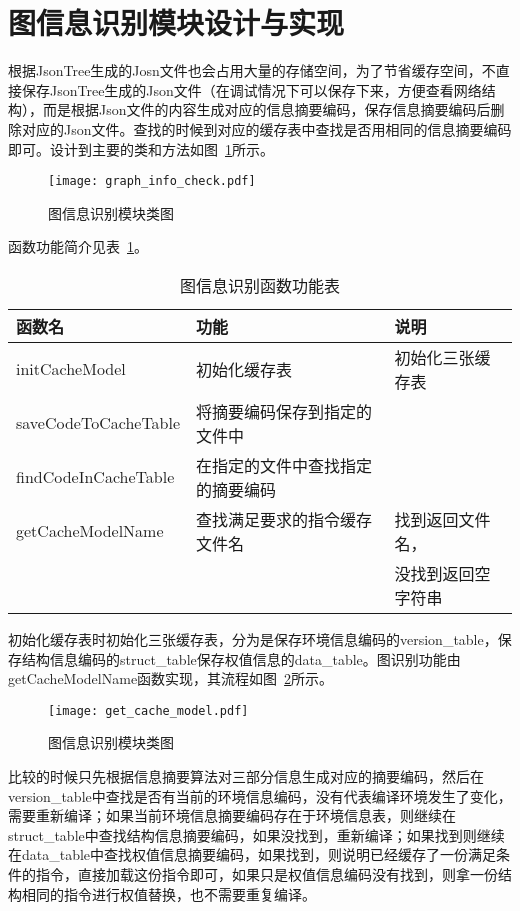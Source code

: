 \section{图信息识别模块设计与实现}
根据JsonTree生成的Josn文件也会占用大量的存储空间，为了节省缓存空间，不直接保存JsonTree生成的Json文件（在调试情况下可以保存下来，方便查看网络结构），而是根据Json文件的内容生成对应的信息摘要编码，保存信息摘要编码后删除对应的Json文件。查找的时候到对应的缓存表中查找是否用相同的信息摘要编码即可。设计到主要的类和方法如图~\ref{fig:graph-info-check}所示。

\begin{figure}[htb]
  \centering
  \texttt{[image: graph\_info\_check.pdf]}
  \caption{图信息识别模块类图}
  \label{fig:graph-info-check}
\end{figure}

函数功能简介见表~\ref{tab:function-desc-tab}。

\begin{table}[htb]
  \centering\small
  \caption{图信息识别函数功能表}
  \label{tab:function-desc-tab}
  \begin{tabular}{lll}
    \toprule
    函数名      & 功能   & 说明                       \\
    \midrule
    initCacheModel       & 初始化缓存表  & 初始化三张缓存表  \\
    saveCodeToCacheTable & 将摘要编码保存到指定的文件中 &     \\
    findCodeInCacheTable & 在指定的文件中查找指定的摘要编码  & \\
    getCacheModelName & 查找满足要求的指令缓存文件名  & 找到返回文件名，\\
                                                  &&没找到返回空字符串 \\
    \bottomrule
  \end{tabular}
\end{table}

初始化缓存表时初始化三张缓存表，分为是保存环境信息编码的version\_table，保存结构信息编码的struct\_table保存权值信息的data\_table。图识别功能由getCacheModelName函数实现，其流程如图~\ref{fig:get-cache-model}所示。

\begin{figure}[htb]
  \centering
  \texttt{[image: get\_cache\_model.pdf]}
  \caption{图信息识别模块类图}
  \label{fig:get-cache-model}
\end{figure}

比较的时候只先根据信息摘要算法对三部分信息生成对应的摘要编码，然后在version\_table中查找是否有当前的环境信息编码，没有代表编译环境发生了变化，需要重新编译；如果当前环境信息摘要编码存在于环境信息表，则继续在struct\_table中查找结构信息摘要编码，如果没找到，重新编译；如果找到则继续在data\_table中查找权值信息摘要编码，如果找到，则说明已经缓存了一份满足条件的指令，直接加载这份指令即可，如果只是权值信息编码没有找到，则拿一份结构相同的指令进行权值替换，也不需要重复编译。

